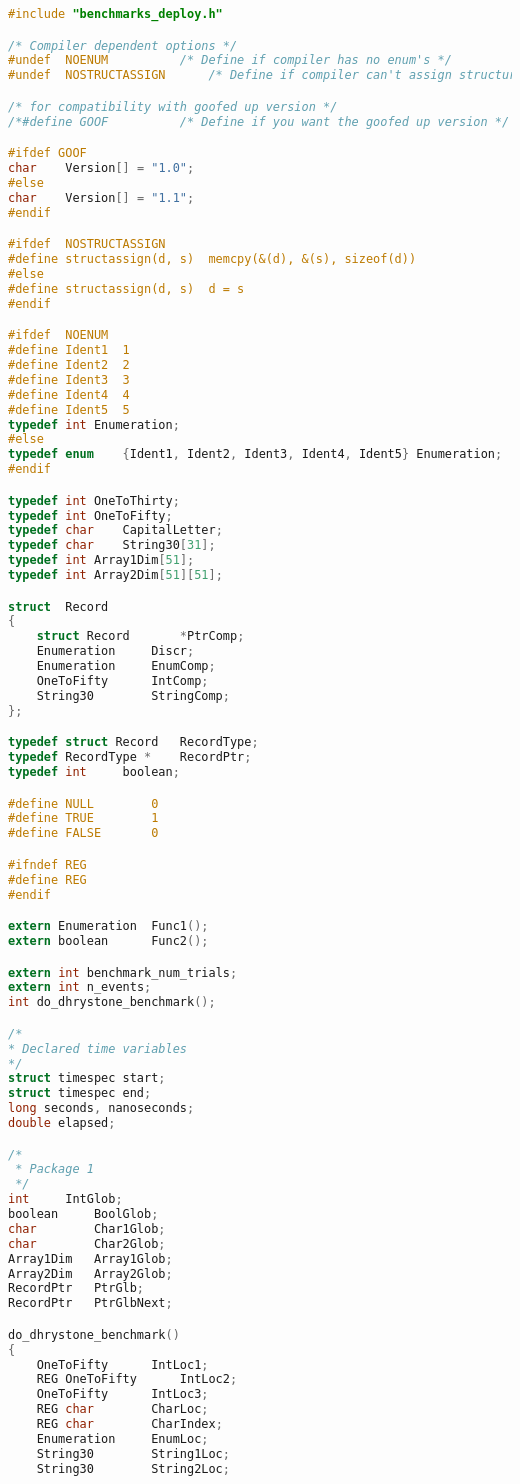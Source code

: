 \begin{lstlisting}[language=C,frame=single,showstringspaces=false,caption={Código fuente del benchmark Dhrystone},label=lst:dhrystone-benchmark]
#include "benchmarks_deploy.h"

/* Compiler dependent options */
#undef	NOENUM			/* Define if compiler has no enum's */
#undef	NOSTRUCTASSIGN		/* Define if compiler can't assign structures */

/* for compatibility with goofed up version */
/*#define GOOF			/* Define if you want the goofed up version */

#ifdef GOOF
char	Version[] = "1.0";
#else
char	Version[] = "1.1";
#endif

#ifdef	NOSTRUCTASSIGN
#define	structassign(d, s)	memcpy(&(d), &(s), sizeof(d))
#else
#define	structassign(d, s)	d = s
#endif

#ifdef	NOENUM
#define	Ident1	1
#define	Ident2	2
#define	Ident3	3
#define	Ident4	4
#define	Ident5	5
typedef int	Enumeration;
#else
typedef enum	{Ident1, Ident2, Ident3, Ident4, Ident5} Enumeration;
#endif

typedef int	OneToThirty;
typedef int	OneToFifty;
typedef char	CapitalLetter;
typedef char	String30[31];
typedef int	Array1Dim[51];
typedef int	Array2Dim[51][51];

struct	Record
{
	struct Record		*PtrComp;
	Enumeration		Discr;
	Enumeration		EnumComp;
	OneToFifty		IntComp;
	String30		StringComp;
};

typedef struct Record 	RecordType;
typedef RecordType *	RecordPtr;
typedef int		boolean;

#define	NULL		0
#define	TRUE		1
#define	FALSE		0

#ifndef REG
#define	REG
#endif

extern Enumeration	Func1();
extern boolean		Func2();

extern int benchmark_num_trials;
extern int n_events;
int do_dhrystone_benchmark();

/*
* Declared time variables
*/
struct timespec start;
struct timespec end;
long seconds, nanoseconds;
double elapsed;

/*
 * Package 1
 */
int		IntGlob;
boolean		BoolGlob;
char		Char1Glob;
char		Char2Glob;
Array1Dim	Array1Glob;
Array2Dim	Array2Glob;
RecordPtr	PtrGlb;
RecordPtr	PtrGlbNext;

do_dhrystone_benchmark()
{
	OneToFifty		IntLoc1;
	REG OneToFifty		IntLoc2;
	OneToFifty		IntLoc3;
	REG char		CharLoc;
	REG char		CharIndex;
	Enumeration	 	EnumLoc;
	String30		String1Loc;
	String30		String2Loc;


\end{lstlisting}
